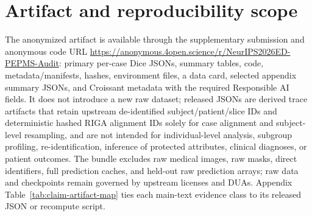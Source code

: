 \documentclass{article}
\begin{document}
\section{Artifact and reproducibility scope}
\label{sec:artifact}
\label{sec:pool-completion}
The anonymized artifact is available through the supplementary submission and anonymous code URL \url{https://anonymous.4open.science/r/NeurIPS2026ED-PEPMS-Audit}: primary per-case Dice JSONs, summary tables, code, metadata/manifests, hashes, environment files, a data card, selected appendix summary JSONs, and Croissant metadata with the required Responsible AI fields. It does not introduce a new raw dataset; released JSONs are derived trace artifacts that retain upstream de-identified subject/patient/slice IDs and deterministic hashed RIGA alignment IDs solely for case alignment and subject-level resampling, and are not intended for individual-level analysis, subgroup profiling, re-identification, inference of protected attributes, clinical diagnoses, or patient outcomes. The bundle excludes raw medical images, raw masks, direct identifiers, full prediction caches, and held-out raw prediction arrays; raw data and checkpoints remain governed by upstream licenses and DUAs. Appendix Table~\ref{tab:claim-artifact-map} ties each main-text evidence class to its released JSON or recompute script.

\newpage
{\small


}

\FloatBarrier
\appendix
\renewcommand{\thesection}{A\arabic{section}}


\FloatBarrier

\end{document}
